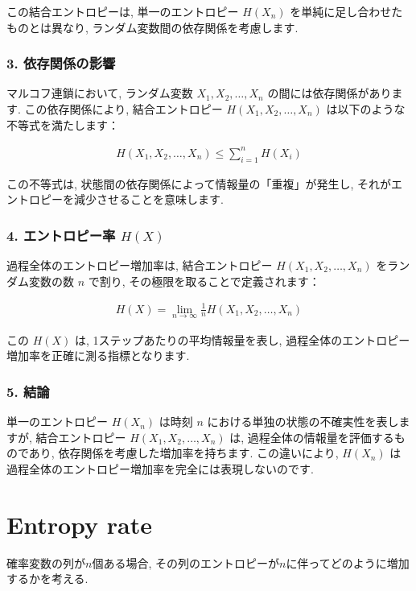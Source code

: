 \documentclass[a4j]{jsarticle}
\begin{document}
{	この結合エントロピーは, 単一のエントロピー $H(X_n)$ を単純に足し合わせたものとは異なり, ランダム変数間の依存関係を考慮します.

	\subsubsection*{3. 依存関係の影響}
	マルコフ連鎖において, ランダム変数 $X_1, X_2, \ldots, X_n$ の間には依存関係があります. この依存関係により, 結合エントロピー $H(X_1, X_2, \ldots, X_n)$ は以下のような不等式を満たします：

	\begin{align*}
		H(X_1, X_2, \ldots, X_n) \leq \sum_{i=1}^n H(X_i)
	\end{align*}

	この不等式は, 状態間の依存関係によって情報量の「重複」が発生し, それがエントロピーを減少させることを意味します.

	\subsubsection*{4. エントロピー率 $H(X)$}
	過程全体のエントロピー増加率は, 結合エントロピー $H(X_1, X_2, \ldots, X_n)$ をランダム変数の数 $n$ で割り, その極限を取ることで定義されます：

	\begin{align*}
		H(X) = \lim_{n \to \infty} \frac{1}{n} H(X_1, X_2, \ldots, X_n)
	\end{align*}

	この $H(X)$ は, 1ステップあたりの平均情報量を表し, 過程全体のエントロピー増加率を正確に測る指標となります.

	\subsubsection*{5. 結論}
	単一のエントロピー $H(X_n)$ は時刻 $n$ における単独の状態の不確実性を表しますが, 結合エントロピー $H(X_1, X_2, \ldots, X_n)$ は, 過程全体の情報量を評価するものであり, 依存関係を考慮した増加率を持ちます. この違いにより, $H(X_n)$ は過程全体のエントロピー増加率を完全には表現しないのです.
}

\section{Entropy rate}

確率変数の列が$n$個ある場合, その列のエントロピーが$n$に伴ってどのように増加するかを考える.\\
\end{document}

